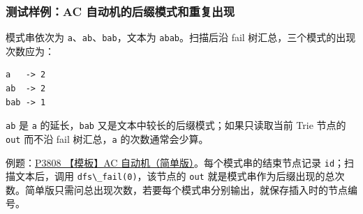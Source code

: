 \subsubsection{测试样例：AC 自动机的后缀模式和重复出现}

模式串依次为 \passthrough{\lstinline!a!}、\passthrough{\lstinline!ab!}、\passthrough{\lstinline!bab!}，文本为 \passthrough{\lstinline!abab!}。扫描后沿 fail 树汇总，三个模式的出现次数应为：

\begin{lstlisting}
a   -> 2
ab  -> 2
bab -> 1
\end{lstlisting}

\passthrough{\lstinline!ab!} 是 \passthrough{\lstinline!a!} 的延长，\passthrough{\lstinline!bab!} 又是文本中较长的后缀模式；如果只读取当前 Trie 节点的 \passthrough{\lstinline!out!} 而不沿 fail 树汇总，\passthrough{\lstinline!a!} 的次数通常会少算。

例题：\href{https://www.luogu.com.cn/problem/P3808}{P3808 【模板】AC 自动机（简单版）}。每个模式串的结束节点记录 \passthrough{\lstinline!id!}；扫描文本后，调用 \passthrough{\lstinline!dfs\_fail(0)!}，该节点的 \passthrough{\lstinline!out!} 就是模式串作为后缀出现的总次数。简单版只需问总出现次数，若要每个模式串分别输出，就保存插入时的节点编号。
